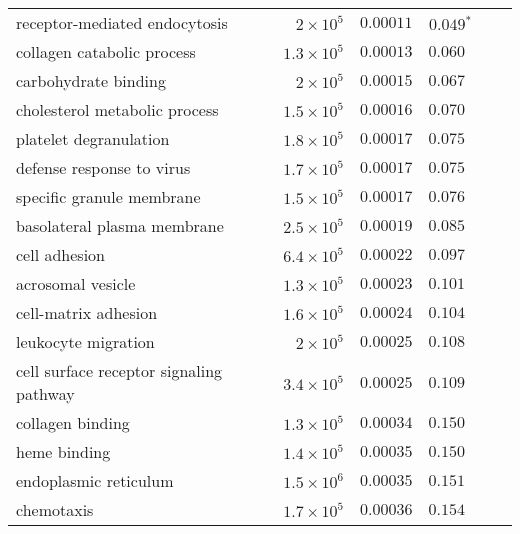 \documentclass{article}
\begin{document}
\begin{longtable}{|l|r|r|r|r|r|}
            receptor-mediated endocytosis &  $ 2\times 10^{5}$ &            $0.00011$ &              $\bm{ 0.049{^*}}$ \\
               collagen catabolic process & $1.3\times 10^{5}$ &            $0.00013$ &                     $ 0.060~~$ \\
                     carbohydrate binding &  $ 2\times 10^{5}$ &            $0.00015$ &                     $ 0.067~~$ \\
            cholesterol metabolic process & $1.5\times 10^{5}$ &            $0.00016$ &                     $ 0.070~~$ \\
                   platelet degranulation & $1.8\times 10^{5}$ &            $0.00017$ &                     $ 0.075~~$ \\
                defense response to virus & $1.7\times 10^{5}$ &            $0.00017$ &                     $ 0.075~~$ \\
                specific granule membrane & $1.5\times 10^{5}$ &            $0.00017$ &                     $ 0.076~~$ \\
              basolateral plasma membrane & $2.5\times 10^{5}$ &            $0.00019$ &                     $ 0.085~~$ \\
                            cell adhesion & $6.4\times 10^{5}$ &            $0.00022$ &                     $ 0.097~~$ \\
                        acrosomal vesicle & $1.3\times 10^{5}$ &            $0.00023$ &                     $ 0.101~~$ \\
                     cell-matrix adhesion & $1.6\times 10^{5}$ &            $0.00024$ &                     $ 0.104~~$ \\
                      leukocyte migration &  $ 2\times 10^{5}$ &            $0.00025$ &                     $ 0.108~~$ \\
  cell surface receptor signaling pathway & $3.4\times 10^{5}$ &            $0.00025$ &                     $ 0.109~~$ \\
                         collagen binding & $1.3\times 10^{5}$ &            $0.00034$ &                     $ 0.150~~$ \\
                             heme binding & $1.4\times 10^{5}$ &            $0.00035$ &                     $ 0.150~~$ \\
                    endoplasmic reticulum & $1.5\times 10^{6}$ &            $0.00035$ &                     $ 0.151~~$ \\
                               chemotaxis & $1.7\times 10^{5}$ &            $0.00036$ &                     $ 0.154~~$ \\

\end{longtable}
\end{document}

